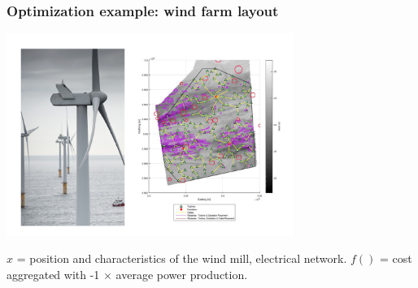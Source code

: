 \documentclass[12pt]{beamer}
\begin{document}
\begin{frame}
\frametitle{Optimization example: wind farm layout}
\begin{center}
\includegraphics[width=0.7\textwidth]{wind_farm_model.pdf}
\end{center}
$x$ = position and characteristics of the wind mill, electrical network.
$f()$ = cost aggregated with -1 $\times$ average power production.
\end{frame}
\end{document}
